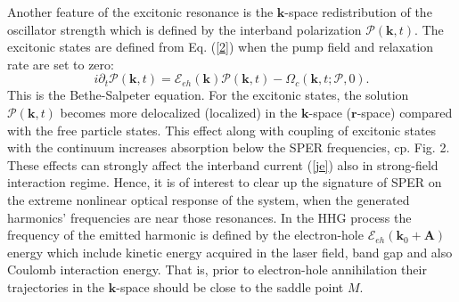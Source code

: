 \documentclass[reprint, superscriptaddress,  aps, pra]{revtex4-2}
\begin{document}
Another feature of the excitonic resonance is the $\mathbf{k}$-space
redistribution \cite{Jornada} of the oscillator strength which is defined by
the interband polarization $\mathcal{P}(\mathbf{k},t)$. The excitonic states
are defined from Eq. (\ref{2}) when the pump field and relaxation rate are
set to zero: 
\begin{equation}
i\partial _{t}\mathcal{P}(\mathbf{k},t)=\mathcal{E}_{eh}\left( \mathbf{k}
\right) \mathcal{P}(\mathbf{k},t)-\Omega _{c}\left( \mathbf{k},t;\mathcal{P}
,0\right) .  \label{BS}
\end{equation}
This is the Bethe-Salpeter equation. For the excitonic states, the solution $%
\mathcal{P}(\mathbf{k},t)$ becomes more delocalized (localized) in the $%
\mathbf{k}$-space ($\mathbf{r}$-space) compared with the free particle
states. This effect along with coupling of excitonic states with the
continuum increases absorption below the SPER frequencies, cp. Fig. 2. These
effects can strongly affect the interband current (\ref{je}) also in
strong-field interaction regime. Hence, it is of interest to clear up the
signature of SPER on the extreme nonlinear optical response of the system,
when the generated harmonics' frequencies are near those resonances. In the
HHG process the frequency of the emitted harmonic is defined by the
electron-hole $\mathcal{E}_{eh}\left( \mathbf{k}_{0}+\mathbf{A}\right)$
energy which include kinetic energy acquired in the laser field, band gap
and also Coulomb interaction energy. That is, prior to electron-hole
annihilation their trajectories in the $\mathbf{k}$-space should be close to
the saddle point $M$.
\end{document}
